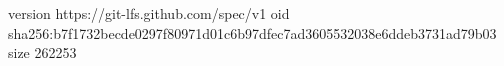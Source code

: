 version https://git-lfs.github.com/spec/v1
oid sha256:b7f1732becde0297f80971d01c6b97dfec7ad3605532038e6ddeb3731ad79b03
size 262253
